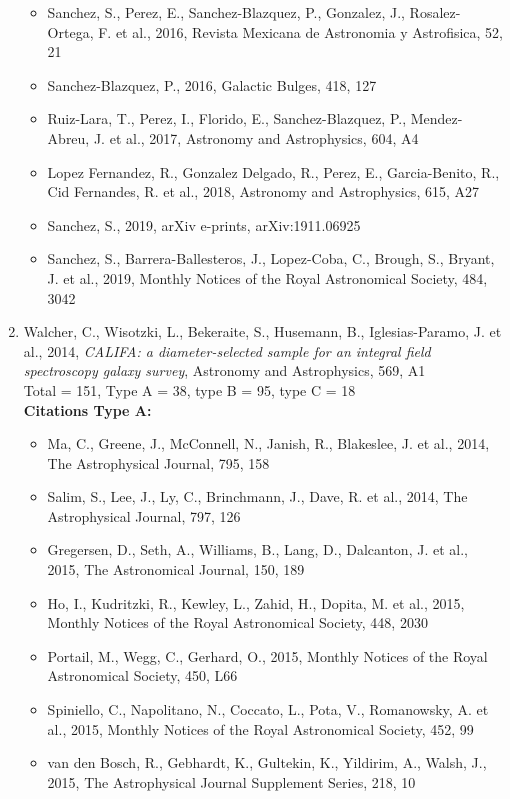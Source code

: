 \documentclass{letter}
\begin{document}
\begin{enumerate}
\begin{itemize}
\item Sanchez, S., Perez, E., Sanchez-Blazquez, P., Gonzalez, J., Rosalez-Ortega, F. et al., 2016, Revista Mexicana de Astronomia y Astrofisica, 52, 21
\item Sanchez-Blazquez, P., 2016, Galactic Bulges, 418, 127
\item Ruiz-Lara, T., Perez, I., Florido, E., Sanchez-Blazquez, P., Mendez-Abreu, J. et al., 2017, Astronomy and Astrophysics, 604, A4
\item Lopez Fernandez, R., Gonzalez Delgado, R., Perez, E., Garcia-Benito, R., Cid Fernandes, R. et al., 2018, Astronomy and Astrophysics, 615, A27
\item Sanchez, S., 2019, arXiv e-prints, arXiv:1911.06925
\item Sanchez, S., Barrera-Ballesteros, J., Lopez-Coba, C., Brough, S., Bryant, J. et al., 2019, Monthly Notices of the Royal Astronomical Society, 484, 3042
\end{itemize}
\item Walcher, C., Wisotzki, L., Bekeraite, S., Husemann, B., Iglesias-Paramo, J. et al., 2014, {\it CALIFA: a diameter-selected sample for an integral field spectroscopy galaxy survey}, Astronomy and Astrophysics, 569, A1 \\ 
Total = 151, Type A = 38, type B = 95, type C = 18 \\ 
{\bf Citations Type A:}
\begin{itemize}
\item Ma, C., Greene, J., McConnell, N., Janish, R., Blakeslee, J. et al., 2014, The Astrophysical Journal, 795, 158
\item Salim, S., Lee, J., Ly, C., Brinchmann, J., Dave, R. et al., 2014, The Astrophysical Journal, 797, 126
\item Gregersen, D., Seth, A., Williams, B., Lang, D., Dalcanton, J. et al., 2015, The Astronomical Journal, 150, 189
\item Ho, I., Kudritzki, R., Kewley, L., Zahid, H., Dopita, M. et al., 2015, Monthly Notices of the Royal Astronomical Society, 448, 2030
\item Portail, M., Wegg, C., Gerhard, O., 2015, Monthly Notices of the Royal Astronomical Society, 450, L66
\item Spiniello, C., Napolitano, N., Coccato, L., Pota, V., Romanowsky, A. et al., 2015, Monthly Notices of the Royal Astronomical Society, 452, 99
\item van den Bosch, R., Gebhardt, K., Gultekin, K., Yildirim, A., Walsh, J., 2015, The Astrophysical Journal Supplement Series, 218, 10

\end{itemize}
\end{enumerate}
\end{document}
